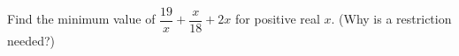 Find the minimum value of $\dfrac{19}{x}+\dfrac {x}{18}+2x$ for positive real $x$. (Why is a restriction needed?)

